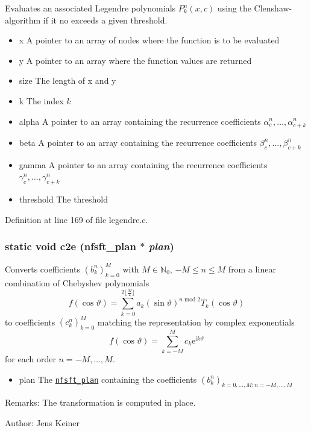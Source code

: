 Evaluates an associated Legendre polynomials $P_k^n(x,c)$ using the Clenshaw-algorithm if it no exceeds a given threshold. 

\begin{itemize}
\item x A pointer to an array of nodes where the function is to be evaluated \item y A pointer to an array where the function values are returned \item size The length of x and y \item k The index $k$ \item alpha A pointer to an array containing the recurrence coefficients $\alpha_c^n,\ldots,\alpha_{c+k}^n$ \item beta A pointer to an array containing the recurrence coefficients $\beta_c^n,\ldots,\beta_{c+k}^n$ \item gamma A pointer to an array containing the recurrence coefficients $\gamma_c^n,\ldots,\gamma_{c+k}^n$ \item threshold The threshold \end{itemize}


Definition at line 169 of file legendre.c.\hypertarget{group__nfsft_g47209b28b6561fca7349ed8afa5f9656}{
\subsubsection{\setlength{\rightskip}{0pt plus 5cm}static void c2e ({\bf nfsft\_\-plan} $\ast$ {\em plan})}}
\label{group__nfsft_g47209b28b6561fca7349ed8afa5f9656}


Converts coefficients $\left(b_k^n\right)_{k=0}^M$ with $M \in \mathbb{N}_0$, $-M \le n \le M$ from a linear combination of Chebyshev polynomials \[ f(\cos\vartheta) = \sum_{k=0}^{2\lfloor\frac{M}{2}\rfloor} a_k (\sin\vartheta)^{n\;\mathrm{mod}\;2} T_k(\cos\vartheta) \] to coefficients $\left(c_k^n\right)_{k=0}^M$ matching the representation by complex exponentials \[ f(\cos\vartheta) = \sum_{k=-M}^{M} c_k \mathrm{e}^{\mathrm{i}k\vartheta} \] for each order $n=-M,\ldots,M$. 

\begin{itemize}
\item plan The {\tt \hyperlink{structnfsft__plan}{nfsft\_\-plan}} containing the coefficients $\left(b_k^n\right)_{k=0,\ldots,M;n=-M,\ldots,M}$\end{itemize}
\begin{Desc}
\item[Remarks:]The transformation is computed in place.\end{Desc}
\begin{Desc}
\item[Author:]Jens Keiner \end{Desc}



